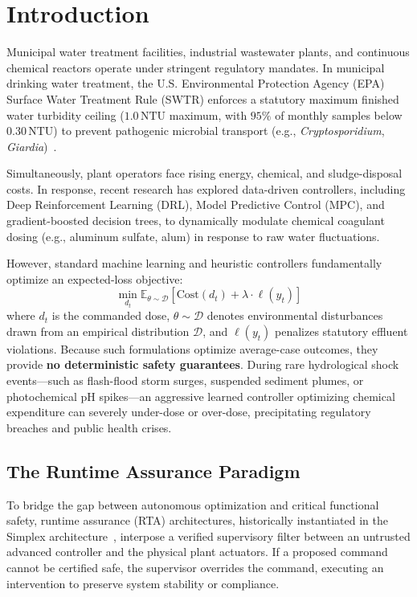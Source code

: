 \documentclass[10pt,twocolumn,letterpaper]{article}
\theoremstyle{definition}
\begin{document}
\section{Introduction}
Municipal water treatment facilities, industrial wastewater plants, and continuous chemical reactors operate under stringent regulatory mandates. In municipal drinking water treatment, the U.S. Environmental Protection Agency (EPA) Surface Water Treatment Rule (SWTR) enforces a statutory maximum finished water turbidity ceiling ($1.0\,\text{NTU}$ maximum, with $95\%$ of monthly samples below $0.30\,\text{NTU}$) to prevent pathogenic microbial transport (e.g., \textit{Cryptosporidium}, \textit{Giardia})~\cite{epa1999enhanced}. 

Simultaneously, plant operators face rising energy, chemical, and sludge-disposal costs. In response, recent research has explored data-driven controllers, including Deep Reinforcement Learning (DRL), Model Predictive Control (MPC), and gradient-boosted decision trees, to dynamically modulate chemical coagulant dosing (e.g., aluminum sulfate, alum) in response to raw water fluctuations. 

However, standard machine learning and heuristic controllers fundamentally optimize an expected-loss objective:
\begin{equation}
\min_{d_t} \mathbb{E}_{\theta \sim \mathcal{D}} \left[ \text{Cost}(d_t) + \lambda \cdot \ell(y_t) \right]
\end{equation}
where $d_t$ is the commanded dose, $\theta \sim \mathcal{D}$ denotes environmental disturbances drawn from an empirical distribution $\mathcal{D}$, and $\ell(y_t)$ penalizes statutory effluent violations. Because such formulations optimize average-case outcomes, they provide \textbf{no deterministic safety guarantees}. During rare hydrological shock events---such as flash-flood storm surges, suspended sediment plumes, or photochemical pH spikes---an aggressive learned controller optimizing chemical expenditure can severely under-dose or over-dose, precipitating regulatory breaches and public health crises.

\subsection{The Runtime Assurance Paradigm}
To bridge the gap between autonomous optimization and critical functional safety, runtime assurance (RTA) architectures, historically instantiated in the Simplex architecture~\cite{sha2001using,bak2014sandboxing}, interpose a verified supervisory filter between an untrusted advanced controller and the physical plant actuators. If a proposed command cannot be certified safe, the supervisor overrides the command, executing an intervention to preserve system stability or compliance.
\end{document}
